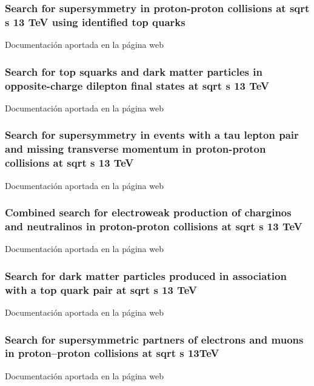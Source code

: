 \documentclass[a4paper, 11pt, twoside, openright]{report}
\begin{document}
\subsubsection{Search for supersymmetry in proton-proton collisions at sqrt s 13 TeV using identified top quarks}
Documentación aportada en la página web
%
\subsubsection{Search for top squarks and dark matter particles in opposite-charge dilepton final states at sqrt s 13 TeV}
Documentación aportada en la página web
%
\subsubsection{Search for supersymmetry in events with a tau lepton pair and missing transverse momentum in proton-proton collisions at sqrt s 13 TeV}
Documentación aportada en la página web
%
\subsubsection{Combined search for electroweak production of charginos and neutralinos in proton-proton collisions at sqrt s 13 TeV}
Documentación aportada en la página web
%
\subsubsection{Search for dark matter particles produced in association with a top quark pair at sqrt s 13 TeV}
Documentación aportada en la página web
%
\subsubsection{Search for supersymmetric partners of electrons and muons in proton–proton collisions at sqrt s 13TeV}
Documentación aportada en la página web
%
\end{document}
